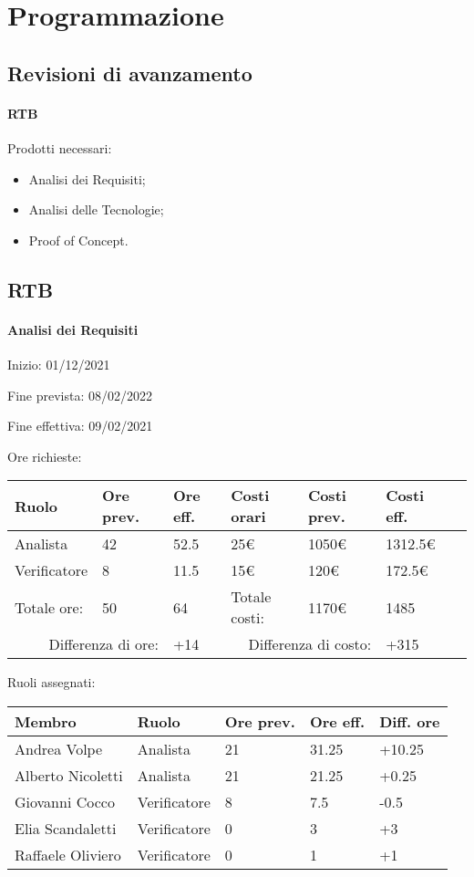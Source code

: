 \documentclass[a4paper, 12pt]{article}
\begin{document}
\makefrontpage

\makeversioni

\section{Programmazione}
\subsection{Revisioni di avanzamento}
\paragraph{RTB}
Prodotti necessari:
\begin{itemize}
\item Analisi dei Requisiti;
\item Analisi delle Tecnologie;
\item Proof of Concept.
\end{itemize}


\subsection{RTB}
\paragraph{Analisi dei Requisiti}
Inizio: 01/12/2021\par
Fine prevista: 08/02/2022\par
Fine effettiva: 09/02/2021

Ore richieste:\\[0.5em]
\begin{tabular}{|l|l|l||l|l|l|l|}\hline
Ruolo & Ore prev. & Ore eff. & Costi orari & Costi prev. & Costi eff.\\\hline
Analista & 42 & 52.5 & 25\euro & 1050\euro & 1312.5\euro \\\hline
Verificatore & 8 & 11.5 & 15\euro & 120\euro & 172.5\euro \\\hline
Totale ore: & 50 & 64 & Totale costi: & 1170\euro & 1485 \\\hline
\multicolumn{2}{|r|}{Differenza di ore:} & +14 & \multicolumn{2}{r|}{Differenza di costo:} & +315 \\\hline
\end{tabular}

Ruoli assegnati:\\[0.5em]
\begin{tabular}{|l|l|l|l|l|}\hline
Membro & Ruolo & Ore prev. & Ore eff. & Diff. ore \\\hline
Andrea Volpe & Analista & 21 & 31.25  & +10.25 \\\hline
Alberto Nicoletti & Analista & 21 & 21.25 & +0.25 \\\hline
Giovanni Cocco & Verificatore & 8 & 7.5 & -0.5 \\\hline
Elia Scandaletti & Verificatore & 0 & 3 & +3 \\\hline
Raffaele Oliviero & Verificatore & 0 & 1 & +1 \\\hline
\end{tabular}
\end{document}
